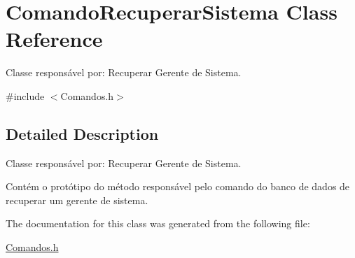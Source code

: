 \hypertarget{class_comando_recuperar_sistema}{}\section{Comando\+Recuperar\+Sistema Class Reference}
\label{class_comando_recuperar_sistema}


Classe responsável por\+: Recuperar Gerente de Sistema.  




{\ttfamily \#include $<$Comandos.\+h$>$}



\subsection{Detailed Description}
Classe responsável por\+: Recuperar Gerente de Sistema. 

Contém o protótipo do método responsável pelo comando do banco de dados de recuperar um gerente de sistema. 

The documentation for this class was generated from the following file\+:\begin{DoxyCompactItemize}
\item 
\hyperlink{_comandos_8h}{Comandos.\+h}\end{DoxyCompactItemize}
